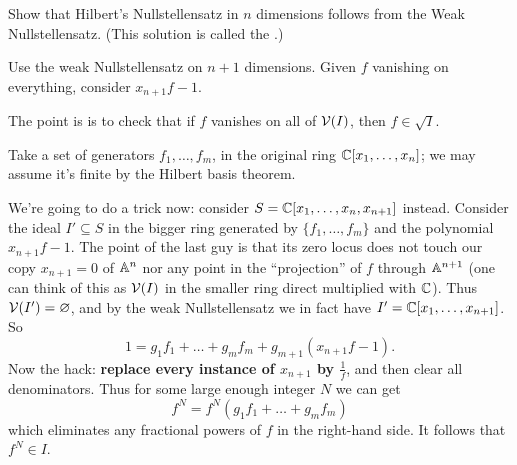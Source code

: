 \begin{problem}
	\yod
	\label{prob:hilbert_from_weak}
	Show that Hilbert's Nullstellensatz in $n$ dimensions
	follows from the Weak Nullstellensatz.
	(This solution is called the .)
	\begin{hint}
		Use the weak Nullstellensatz on $n+1$ dimensions.
		Given $f$ vanishing on everything,
		consider $x_{n+1}f-1$. 
	\end{hint}
	\begin{sol}
		The point is is to check that if $f$ vanishes on all of $\mathcal V(I)$,
		then $f \in \sqrt I$.

		Take a set of generators $f_1, \dots, f_m$,
		in the original ring $\mathbb C[x_1, \dots, x_n]$;
		we may assume it's finite by the Hilbert basis theorem.

		We're going to do a trick now:
		consider $S = \mathbb C[x_1, \dots, x_n, x_{n+1}]$ instead.
		Consider the ideal $I' \subseteq S$ in the bigger ring
		generated by $\{f_1, \dots, f_m\}$ and the polynomial $x_{n+1} f - 1$.
		The point of the last guy is that its zero locus
		does not touch our copy $x_{n+1}=0$ of $\mathbb A^n$
		nor any point in the ``projection'' of $f$ through $\mathbb A^{n+1}$
		(one can think of this as $\mathcal V(I)$ in the smaller ring
		direct multiplied with $\mathbb C$).
		Thus $\mathcal V(I') = \varnothing$, and by the weak Nullstellensatz
		we in fact have $I' = \mathbb C[x_1, \dots, x_{n+1}]$.
		So
		\[ 1 = g_1f_1 + \dots + g_mf_m + g_{m+1} \left( x_{n+1}f-1 \right). \]
		Now the hack: \textbf{replace every instance of $x_{n+1}$ by $\frac 1f$},
		and then clear all denominators.
		Thus for some large enough integer $N$ we can get
		\[ f^N = f^N(g_1f_1 + \dots + g_mf_m) \]
		which eliminates any fractional powers of $f$ in the right-hand side.
		It follows that $f^N \in I$.
	\end{sol}
\end{problem}


